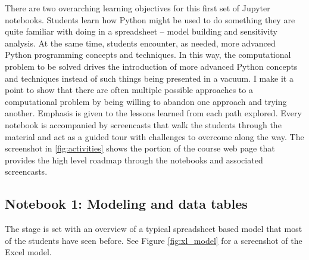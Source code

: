 \documentclass[ited,blindrev]{informs3}              %
\begin{document}
There are two overarching learning objectives for this first set of Jupyter notebooks. Students learn how Python might be used to do something they are quite familiar with doing in a spreadsheet -- model building and sensitivity analysis. At the same time, students encounter, as needed, more advanced Python programming concepts and techniques. In this way, the computational problem to be solved drives the introduction of more advanced Python concepts and techniques instead of such things being presented in a vacuum. I make it a point to show that there are often multiple possible approaches to a computational problem by being willing to abandon one approach and trying another. Emphasis is given to the lessons learned from each path explored. Every notebook is accompanied by screencasts that walk the students through the material and act as a guided tour with challenges to overcome along the way. The screenshot in \ref{fig:activities} shows the portion of the course web page that provides the high level roadmap through the notebooks and associated screencasts.
 
 
\subsection{Notebook 1: Modeling and data tables}

The stage is set with an overview of a typical spreadsheet based model that most of the students have seen before. See Figure \ref{fig:xl_model} for a screenshot of the Excel model.
\end{document}
